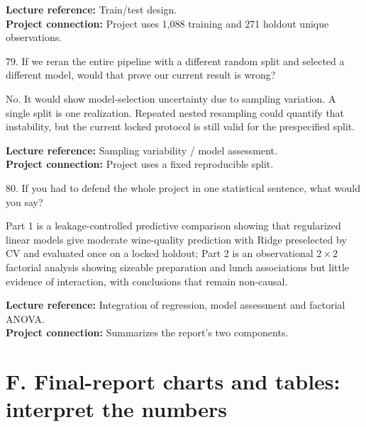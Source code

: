 \documentclass[10.5pt,a4paper]{article}
\newcommand{\chapref}[1]{\textbf{Lecture reference:} #1}
\newcommand{\projectref}[1]{\textbf{Project connection:} #1}
\begin{document}
\begin{refbox}\chapref{Train/test design.}\\\projectref{Project uses 1,088 training and 271 holdout unique observations.}\end{refbox}
\begin{qbox}{79. If we reran the entire pipeline with a different random split and selected a different model, would that prove our current result is wrong?}
\end{qbox}
\begin{answerbox}No. It would show model-selection uncertainty due to sampling variation. A single split is one realization. Repeated nested resampling could quantify that instability, but the current locked protocol is still valid for the prespecified split.\end{answerbox}
\begin{refbox}\chapref{Sampling variability / model assessment.}\\\projectref{Project uses a fixed reproducible split.}\end{refbox}
\begin{qbox}{80. If you had to defend the whole project in one statistical sentence, what would you say?}
\end{qbox}
\begin{answerbox}Part 1 is a leakage-controlled predictive comparison showing that regularized linear models give moderate wine-quality prediction with Ridge preselected by CV and evaluated once on a locked holdout; Part 2 is an observational \(2\times2\) factorial analysis showing sizeable preparation and lunch associations but little evidence of interaction, with conclusions that remain non-causal.\end{answerbox}
\begin{refbox}\chapref{Integration of regression, model assessment and factorial ANOVA.}\\\projectref{Summarizes the report's two components.}\end{refbox}


\section*{F. Final-report charts and tables: interpret the numbers}
\end{document}
